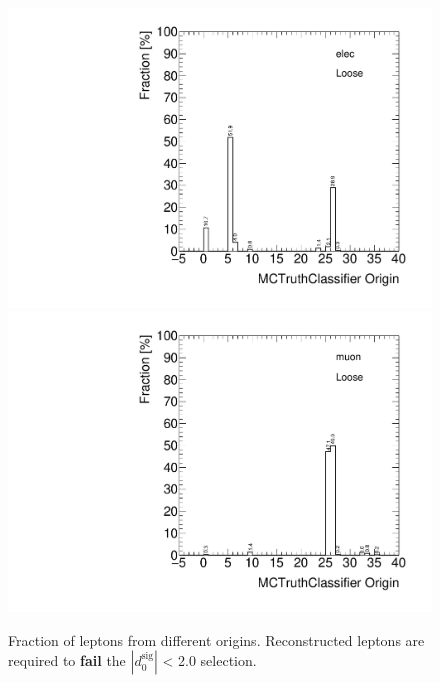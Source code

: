 \begin{figure}[!htbp]
\begin{center}
\includegraphics[scale=0.33]{./figures/boosted/FakeLeptons/JZXW_Origin_elec_Loose}
\includegraphics[scale=0.33]{./figures/boosted/FakeLeptons/JZXW_Origin_muon_Loose}
\caption{Fraction of leptons from different origins. Reconstructed leptons are required to \textbf{fail} the $|d_{0}^{\textrm{sig}}|$ < 2.0 selection.}
\label{fig:boosted_fakeorigin_loosecut}
\end{center}
\end{figure}








